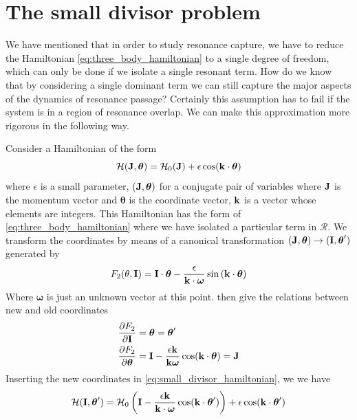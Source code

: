 \documentclass[twoside,openright,titlepage,numbers=noenddot,headinclude,%
                footinclude=true,cleardoublepage=empty,abstractoff, 
                BCOR=5mm,paper=a4,fontsize=11pt,%
                american,%
                ]{scrreprt}%
\begin{document}
\section{The small divisor problem}
\label{sec:small_divisor}
We have mentioned that in order to study resonance capture, we have
to reduce the Hamiltonian \ref{eq:three_body_hamiltonian} to a 
single degree of freedom, which can only be done if we isolate 
a single resonant term. How do we know that by considering a single
dominant term we can still capture the major aspects of the dynamics
of resonance passage? Certainly this assumption has to fail if
the system is in a region of resonance overlap. We can make this 
approximation more rigorous in the following way.

Consider a Hamiltonian of the form
\begin{equation}
    \mathcal{H}(\boldsymbol{\mathbf{J}},\boldsymbol{\theta})=\mathcal{H}_0(\boldsymbol{\mathbf{J}})+
    \epsilon\cos(\boldsymbol{\mathbf{k}}\cdot\boldsymbol{\theta})
    \label{eq:small_divisor_hamiltonian}
\end{equation}
where $\epsilon$ is a small parameter, $(\boldsymbol{\mathbf{J}},\boldsymbol{\theta})$
for a conjugate pair of variables where $\boldsymbol{\mathbf{J}}$ is the momentum
vector and $\boldsymbol{\theta}$ is the coordinate vector, $\boldsymbol{\mathbf{k}}$ is
a vector whose elements are integers. This Hamiltonian has the form of
\cref{eq:three_body_hamiltonian} where we have isolated a particular term
in $\mathcal{R}$. We transform the coordinates
by means of a canonical transformation $(\boldsymbol{\mathbf{J}},\boldsymbol{\theta})
\rightarrow (\boldsymbol{\mathbf{I}},\boldsymbol{\theta}')$ generated by
\begin{equation}
    F_2(\theta, \boldsymbol{\mathbf{I}})=\boldsymbol{\mathbf{I}}\cdot\boldsymbol{\theta}
    - \frac{\epsilon}{\boldsymbol{\mathbf{k}}\cdot\boldsymbol{\omega}} \sin{(\boldsymbol{\mathbf{k}}\cdot
    \boldsymbol{\theta})}
\end{equation}
Where $\boldsymbol{\omega}$ is just an unknown vector at this point.
 then give the relations between new and old
coordinates
\begin{align}
    \frac{\partial F_2}{\partial \boldsymbol{\mathbf{I}}} &=\boldsymbol{\theta}
    =\boldsymbol{\theta}'\\
    \frac{\partial F_2}{\partial \boldsymbol{\theta}}&=\boldsymbol{\mathbf{I}}
    - \frac{\epsilon\boldsymbol{\mathbf{k}}}{\boldsymbol{\mathbf{k}}\boldsymbol{\omega}}\cos
    (\boldsymbol{\mathbf{k}}\cdot\boldsymbol{\theta})=\boldsymbol{\mathbf{J}}
    \label{eq:small_divisor}
\end{align}
Inserting the new coordinates in \cref{eq:small_divisor_hamiltonian}, we
we have
\begin{equation}
    \mathcal{H}(\boldsymbol{\mathbf{I}},\boldsymbol{\theta}')=\mathcal{H}_0\left(
\boldsymbol{\mathbf{I}} - \frac{\epsilon\boldsymbol{\mathbf{k}}}{\boldsymbol{\mathbf{k}}\cdot\boldsymbol{\omega}}\cos
    (\boldsymbol{\mathbf{k}}\cdot\boldsymbol{\theta}')\right) +\epsilon\cos
    (\boldsymbol{\mathbf{k}}\cdot\boldsymbol{\theta}')
\end{equation}
\end{document}
